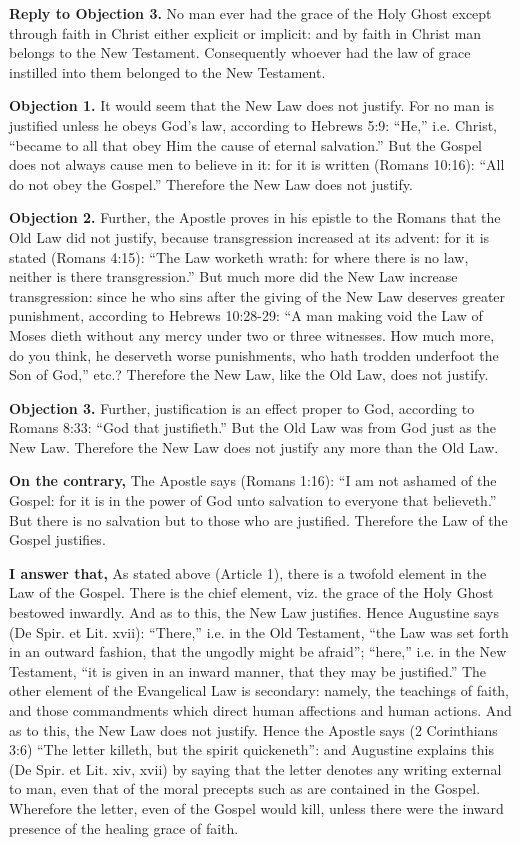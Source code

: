\textbf{Reply to Objection 3.} No man ever had the grace of the Holy Ghost except through faith in Christ either explicit or implicit: and by faith in Christ man belongs to the New Testament. Consequently whoever had the law of grace instilled into them belonged to the New Testament.


\textbf{Objection 1.} It would seem that the New Law does not justify. For no man is justified unless he obeys God's law, according to Hebrews 5:9: ``He,'' i.e. Christ, ``became to all that obey Him the cause of eternal salvation.'' But the Gospel does not always cause men to believe in it: for it is written (Romans 10:16): ``All do not obey the Gospel.'' Therefore the New Law does not justify.

\textbf{Objection 2.} Further, the Apostle proves in his epistle to the Romans that the Old Law did not justify, because transgression increased at its advent: for it is stated (Romans 4:15): ``The Law worketh wrath: for where there is no law, neither is there transgression.'' But much more did the New Law increase transgression: since he who sins after the giving of the New Law deserves greater punishment, according to Hebrews 10:28-29: ``A man making void the Law of Moses dieth without any mercy under two or three witnesses. How much more, do you think, he deserveth worse punishments, who hath trodden underfoot the Son of God,'' etc.? Therefore the New Law, like the Old Law, does not justify.

\textbf{Objection 3.} Further, justification is an effect proper to God, according to Romans 8:33: ``God that justifieth.'' But the Old Law was from God just as the New Law. Therefore the New Law does not justify any more than the Old Law.

\textbf{On the contrary,} The Apostle says (Romans 1:16): ``I am not ashamed of the Gospel: for it is in the power of God unto salvation to everyone that believeth.'' But there is no salvation but to those who are justified. Therefore the Law of the Gospel justifies.

\textbf{I answer that,} As stated above (Article 1), there is a twofold element in the Law of the Gospel. There is the chief element, viz. the grace of the Holy Ghost bestowed inwardly. And as to this, the New Law justifies. Hence Augustine says (De Spir. et Lit. xvii): ``There,'' i.e. in the Old Testament, ``the Law was set forth in an outward fashion, that the ungodly might be afraid''; ``here,'' i.e. in the New Testament, ``it is given in an inward manner, that they may be justified.'' The other element of the Evangelical Law is secondary: namely, the teachings of faith, and those commandments which direct human affections and human actions. And as to this, the New Law does not justify. Hence the Apostle says (2 Corinthians 3:6) ``The letter killeth, but the spirit quickeneth'': and Augustine explains this (De Spir. et Lit. xiv, xvii) by saying that the letter denotes any writing external to man, even that of the moral precepts such as are contained in the Gospel. Wherefore the letter, even of the Gospel would kill, unless there were the inward presence of the healing grace of faith.

